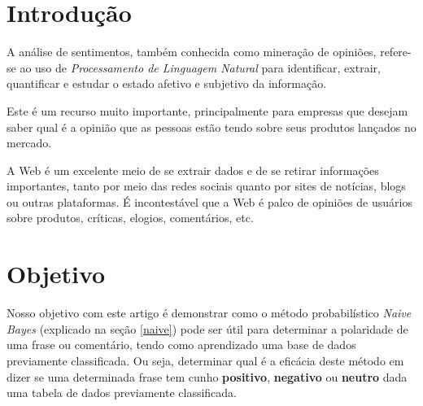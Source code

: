 \documentclass[
article,			%
12pt,				%
a4paper,			%
english,			%
brazil,				%
sumario=tradicional,
twoside
]{abntex2}
\begin{document}
	
	
	\frenchspacing 
	
	
	\maketitle
	

	
	
	\textual
	
	\section{Introdução}
	A análise de sentimentos, também conhecida como mineração de opiniões, refere-se ao uso de \emph{Processamento de Linguagem Natural} para identificar, extrair, quantificar e estudar o estado afetivo e subjetivo da informação.

	Este é um recurso muito importante, principalmente para empresas que desejam saber qual é a opinião que as pessoas estão tendo sobre seus produtos lançados no mercado.
	
	A Web é um excelente meio de se extrair dados e de se retirar informações importantes, tanto por meio das redes sociais quanto por sites de notícias, blogs ou outras plataformas. É incontestável que a Web é palco de opiniões de usuários sobre produtos, críticas, elogios, comentários, etc.
	
	\section{Objetivo}
	
	Nosso objetivo com este artigo é demonstrar como o método probabilístico \emph{Naive Bayes} (explicado na seção \ref{naive}) pode ser útil para determinar a polaridade de uma frase ou comentário, tendo como aprendizado uma base de dados previamente classificada. Ou seja, determinar qual é a eficácia deste método em dizer se uma determinada frase tem cunho \textbf{positivo}, \textbf{negativo} ou \textbf{neutro} dada uma tabela de dados previamente classificada.
	
\end{document}

